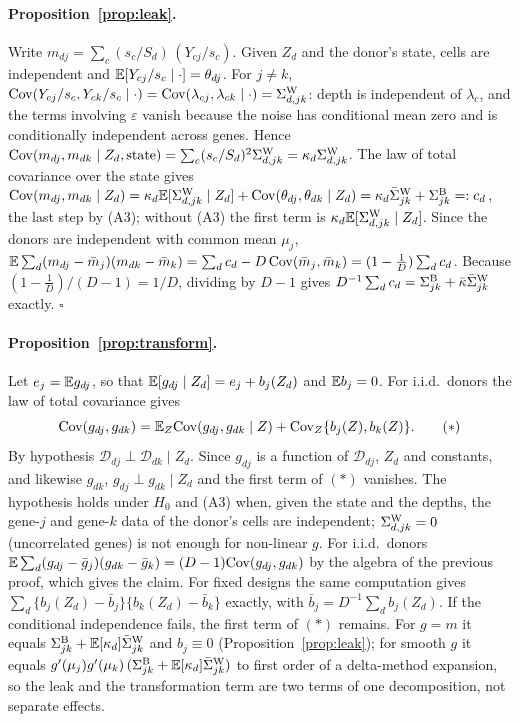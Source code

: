 \paragraph{Proposition~\ref{prop:leak}.} Write $m_{dj}=\sum_c (s_c/S_d)\,(Y_{cj}/s_c)$. Given $Z_d$ and the donor's state, cells are independent and $\mathbb{E}[Y_{cj}/s_c\mid\cdot]=\theta_{dj}$. For $j\neq k$, $\mathrm{Cov}(Y_{cj}/s_c,Y_{ck}/s_c\mid\cdot)=\mathrm{Cov}(\lambda_{cj},\lambda_{ck}\mid\cdot)=\Sigma^{\mathrm{W}}_{d,jk}$: depth is independent of $\lambda_c$, and the terms involving $\varepsilon$ vanish because the noise has conditional mean zero and is conditionally independent across genes. Hence $\mathrm{Cov}(m_{dj},m_{dk}\mid Z_d,\text{state})=\sum_c(s_c/S_d)^2\Sigma^{\mathrm{W}}_{d,jk}=\kappa_d\Sigma^{\mathrm{W}}_{d,jk}$. The law of total covariance over the state gives $\mathrm{Cov}(m_{dj},m_{dk}\mid Z_d)=\kappa_d\mathbb{E}[\Sigma^{\mathrm{W}}_{d,jk}\mid Z_d]+\mathrm{Cov}(\theta_{dj},\theta_{dk}\mid Z_d)=\kappa_d\bar\Sigma^{\mathrm W}_{jk}+\Sigma^{\mathrm{B}}_{jk}=:c_d$, the last step by (A3); without (A3) the first term is $\kappa_d\mathbb{E}[\Sigma^{\mathrm{W}}_{d,jk}\mid Z_d]$. Since the donors are independent with common mean $\mu_j$, $\mathbb{E}\sum_d(m_{dj}-\bar m_j)(m_{dk}-\bar m_k)=\sum_d c_d-D\,\mathrm{Cov}(\bar m_j,\bar m_k)=(1-\tfrac1D)\sum_dc_d$. Because $(1-\tfrac1D)/(D-1)=1/D$, dividing by $D-1$ gives $D^{-1}\sum_dc_d=\Sigma^{\mathrm{B}}_{jk}+\bar\kappa\bar\Sigma^{\mathrm W}_{jk}$ exactly. $\square$

\paragraph{Proposition~\ref{prop:transform}.} Let $e_j=\mathbb{E} g_{dj}$, so that $\mathbb{E}[g_{dj}\mid Z_d]=e_j+b_j(Z_d)$ and $\mathbb{E} b_j=0$. For i.i.d.\ donors the law of total covariance gives
\[\mathrm{Cov}(g_{dj},g_{dk})=\mathbb{E}_Z\mathrm{Cov}(g_{dj},g_{dk}\mid Z)+\mathrm{Cov}_Z\{b_j(Z),b_k(Z)\}.\tag{$*$}\]
By hypothesis $\mathcal D_{dj}\perp\mathcal D_{dk}\mid Z_d$. Since $g_{dj}$ is a function of $\mathcal D_{dj}$, $Z_d$ and constants, and likewise $g_{dk}$, $g_{dj}\perp g_{dk}\mid Z_d$ and the first term of $(*)$ vanishes. The hypothesis holds under $H_0$ and (A3) when, given the state and the depths, the gene-$j$ and gene-$k$ data of the donor's cells are independent; $\Sigma^{\mathrm{W}}_{d,jk}=0$ (uncorrelated genes) is not enough for non-linear $g$. For i.i.d.\ donors $\mathbb{E}\sum_d(g_{dj}-\bar g_j)(g_{dk}-\bar g_k)=(D-1)\mathrm{Cov}(g_{dj},g_{dk})$ by the algebra of the previous proof, which gives the claim. For fixed designs the same computation gives $\sum_d\{b_j(Z_d)-\bar b_j\}\{b_k(Z_d)-\bar b_k\}$ exactly, with $\bar b_j=D^{-1}\sum_db_j(Z_d)$. If the conditional independence fails, the first term of $(*)$ remains. For $g=m$ it equals $\Sigma^{\mathrm{B}}_{jk}+\mathbb{E}[\kappa_d]\bar\Sigma^{\mathrm W}_{jk}$ and $b_j\equiv0$ (Proposition~\ref{prop:leak}); for smooth $g$ it equals $g'(\mu_j)g'(\mu_k)\,(\Sigma^{\mathrm{B}}_{jk}+\mathbb{E}[\kappa_d]\bar\Sigma^{\mathrm W}_{jk})$ to first order of a delta-method expansion, so the leak and the transformation term are two terms of one decomposition, not separate effects.

